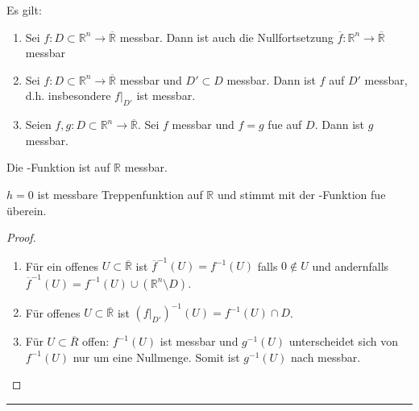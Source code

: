 \begin{proposition}
	Es gilt:\begin{enumerate}[label={\alph*)}]
		\item Sei $f:D\subset\mathbb{R}^n\to\overline{\mathbb{R}}$ messbar. Dann ist auch die Nullfortsetzung $\overline{f}:\mathbb{R}^n\to\overline{\mathbb{R}}$ messbar
		\item Sei $f:D\subset\mathbb{R}^n\to\overline{\mathbb{R}}$ messbar und $D'\subset D$ messbar. Dann ist $f$ auf $D'$ messbar, d.h. insbesondere $\left. f\right|_{D'}$ ist messbar.
		\item Seien $f,g:D\subset\mathbb{R}^n\to\overline{\mathbb{R}}$. Sei $f$ messbar und $f=g$ \gls{fue} auf $D$. Dann ist $g$ messbar.
	\end{enumerate}
\end{proposition}

\begin{example}
	Die -Funktion ist auf $\mathbb{R}$ messbar.
	
	$h=0$ ist messbare Treppenfunktion auf $\mathbb{R}$ und stimmt mit der -Funktion \gls{fue} überein.
\end{example}

\begin{proof}\hspace*{0pt}
	\begin{enumerate}[label={(\alph*)},topsep=\dimexpr -\baselineskip / 2\relax]
		\item Für ein offenes $U\subset\overline{\mathbb{R}}$ ist $\overline{f}^{-1}(U) = f^{-1}(U)$ falls $0\notin U$ und andernfalls $\overline{f}^{-1}(U) = f^{-1}(U)\cup (\mathbb{R}^n\setminus D)$.
		\item Für offenes $U\subset\overline{\mathbb{R}}$ ist $\left(\left. f\right|_{D'}\right)^{-1} (U) = f^{-1} (U)\cap D$.
		\item Für $U\subset\overline{R}$ offen: $f^{-1}(U)$ ist messbar und $g^{-1}(U)$ unterscheidet sich von $f^{-1}(U)$ nur um eine Nullmenge. Somit ist $g^{-1}(U)$ nach  messbar.
	\end{enumerate}
\end{proof}

\rule{0.4\linewidth}{0.1pt}

